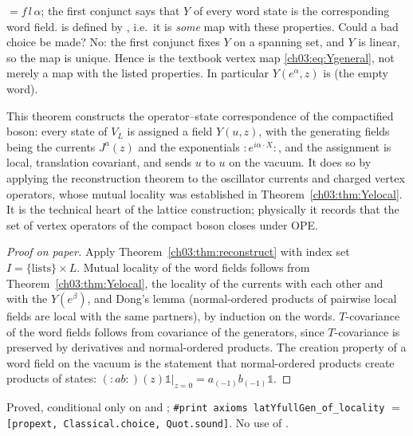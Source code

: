 \begin{dictionary}
 $=f\,l\,\alpha$; the first conjunct says that $Y$ of every word
state is the corresponding word field.  is defined by , i.e.\ it is
\emph{some} map with these properties. Could a bad choice be made? No: the first conjunct fixes
$Y$ on a spanning set, and $Y$ is linear, so the map is unique. Hence  is the
textbook vertex map \eqref{ch03:eq:Ygeneral}, not merely a map with the listed properties.
In particular $Y(e^\alpha,z)$ is  (the empty word).
\end{dictionary}

\begin{physics}
This theorem constructs the operator--state correspondence of the compactified boson: every state of $V_L$ is assigned a field $Y(u,z)$, with the generating fields being the currents $J^a(z)$ and the exponentials $:\!e^{i\alpha\cdot X}\!:$, and the assignment is local, translation covariant, and sends $u$ to $u$ on the vacuum. It does so by applying the reconstruction theorem to the oscillator currents and charged vertex operators, whose mutual locality was established in Theorem~\ref{ch03:thm:Yelocal}. It is the technical heart of the lattice construction; physically it records that the set of vertex operators of the compact boson closes under OPE.
\end{physics}

\begin{proof}[Proof on paper]
Apply Theorem~\ref{ch03:thm:reconstruct} with index set $I=\{\text{lists}\}\times L$. Mutual
locality of the word fields follows from Theorem~\ref{ch03:thm:Yelocal}, the locality of the
currents with each other and with the $Y(e^\beta)$, and Dong's lemma (normal-ordered products of
pairwise local fields are local with the same partners), by induction on the words.
$T$-covariance of the word fields follows from covariance of the generators, since
$T$-covariance is preserved by derivatives and normal-ordered products. The creation property of
a word field on the vacuum is the statement that normal-ordered products create products of
states: $({:}ab{:})(z)\mathbb1|_{z=0}=a_{(-1)}b_{(-1)}\mathbb 1$.
\end{proof}

\begin{status}
Proved, conditional only on  and ;
\texttt{\#print axioms latYfullGen\_of\_locality} $=$ \texttt{[propext, Classical.choice,
Quot.sound]}. No use of .
\end{status}

